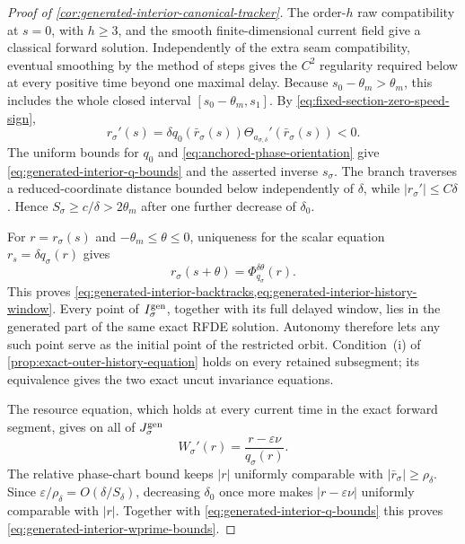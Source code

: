 \begin{proof}[Proof of
\cref{cor:generated-interior-canonical-tracker}]
The order-\(h\) raw compatibility at \(s=0\), with \(h\ge3\), and the
smooth finite-dimensional current field give a classical forward solution.
Independently of the extra seam compatibility, eventual smoothing by the
method of steps gives the \(C^2\) regularity required below at every positive
time beyond one maximal delay.  Because \(s_0-\theta_m>\theta_m\), this
includes the whole closed interval
\([s_0-\theta_m,s_1]\).  By
\cref{eq:fixed-section-zero-speed-sign},
\begin{equation}
 r_\sigma'(s)
 =\delta q_0(\bar r_\sigma(s))
       \Theta_{a_{\sigma,\delta}}'(\bar r_\sigma(s))<0.
                                                               \label{eq:proof-generated-interior-speed}
\end{equation}
The uniform bounds for \(q_0\) and
\cref{eq:anchored-phase-orientation} give
\cref{eq:generated-interior-q-bounds} and the asserted inverse
\(s_\sigma\).  The branch traverses a reduced-coordinate distance bounded
below independently of \(\delta\), while
\(|r_\sigma'|\le C\delta\).  Hence
\(S_\sigma\ge c/\delta>2\theta_m\) after one further decrease of
\(\delta_0\).

For \(r=r_\sigma(s)\) and
\(-\theta_m\le\theta\le0\), uniqueness for the scalar equation
\(r_s=\delta q_\sigma(r)\) gives
\[
 r_\sigma(s+\theta)
 =\Phi_{q_\sigma}^{\delta\theta}(r).
\]
This proves
\cref{eq:generated-interior-backtracks,eq:generated-interior-history-window}.
Every point of \(I_\sigma^{\rm gen}\), together with its full delayed
window, lies in the generated part of the same exact RFDE solution.
Autonomy therefore lets any such point serve as the initial point of the
restricted orbit.  Condition~\textup{(i)} of
\cref{prop:exact-outer-history-equation} holds on every retained subsegment;
its equivalence gives the two exact uncut invariance equations.

The resource equation, which holds at every current time in the exact
forward segment, gives on all of \(J_\sigma^{\rm gen}\)
\[
 W_\sigma'(r)=\frac{r-\varepsilon\nu}{q_\sigma(r)}.
\]
The relative phase-chart bound keeps \(|r|\) uniformly comparable with
\(|\bar r_\sigma|\ge\rho_\delta\).  Since
\(\varepsilon/\rho_\delta=O(\delta/S_\delta)\), decreasing \(\delta_0\)
once more makes \(|r-\varepsilon\nu|\) uniformly comparable with \(|r|\).
Together with \cref{eq:generated-interior-q-bounds} this proves
\cref{eq:generated-interior-wprime-bounds}.


\end{proof}
